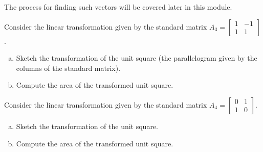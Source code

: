 \begin{applicationActivities}{1}{25}
\begin{observation}
  \begin{center}
  \end{center}

  The process for finding such vectors will be covered later in this module.
\end{observation}


\begin{activity}{5}
Consider the linear transformation given by the standard matrix
 $A_3 = \begin{bmatrix} 1 & -1 \\ 1 & 1 \end{bmatrix}$.

\begin{enumerate}[(a)]
\item Sketch the transformation of the unit square
      (the parallelogram given by the columns of the standard matrix).
\item Compute the area of the transformed unit square.
\end{enumerate}
\end{activity}


\begin{activity}{5}
Consider the linear transformation given by the standard matrix
 $A_4 = \begin{bmatrix} 0 & 1 \\ 1 & 0 \end{bmatrix}$.

\begin{enumerate}[(a)]
\item Sketch the transformation of the unit square.
\item Compute the area of the transformed unit square.
\end{enumerate}
\end{activity}


\end{applicationActivities}
